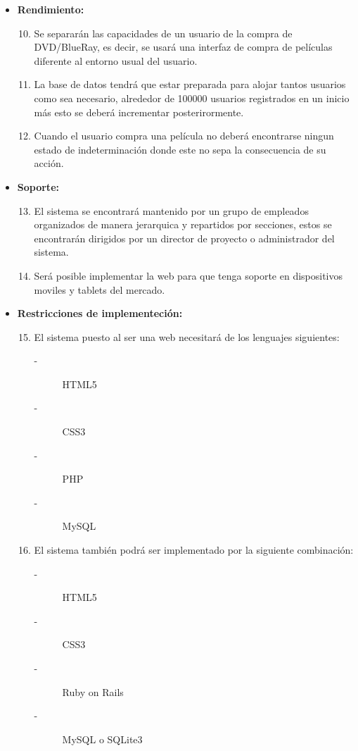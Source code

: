 \documentclass{article}
\begin{document}
\begin{itemize}
    \item \textbf{Rendimiento:}
        \begin{enumerate}[label=\bfseries RN- \arabic*:]
        \setcounter{enumi}{9}
        \item Se separarán las capacidades de un usuario de la compra de DVD/BlueRay, es decir, se usará una interfaz de compra de películas diferente al entorno usual del usuario.
        \item La base de datos tendrá que estar preparada para alojar tantos usuarios como sea necesario, alrededor de 100000 usuarios registrados en un inicio más esto se deberá incrementar posterirormente.
        \item Cuando el usuario compra una película no deberá encontrarse ningun estado de indeterminación donde este no sepa la consecuencia de su acción.
        \end{enumerate}
        
    \item \textbf{Soporte:}
        \begin{enumerate}[label=\bfseries RN- \arabic*:]
        \setcounter{enumi}{12}
        \item El sistema se encontrará mantenido por un grupo de empleados organizados de manera jerarquica y repartidos por secciones, estos se encontrarán dirigidos por un director de proyecto o administrador del sistema.
        \item Será posible implementar la web para que tenga soporte en dispositivos moviles y tablets del mercado.
        \end{enumerate}
        
    \item \textbf{Restricciones de implementeción:}
        \begin{enumerate}[label=\bfseries RN- \arabic*:]
        \setcounter{enumi}{14}
        \item El sistema puesto al ser una web necesitará de los lenguajes siguientes:
            \begin{description}
            \item[-] HTML5
            \item[-] CSS3
            \item[-] PHP
            \item[-] MySQL
            \end{description}
        \item El sistema también podrá ser implementado por la siguiente combinación:
            \begin{description}
            \item[-] HTML5
            \item[-] CSS3
            \item[-] Ruby on Rails
            \item[-] MySQL o SQLite3
            \end{description}
        \end{enumerate}
        

\end{itemize}
\end{document}
